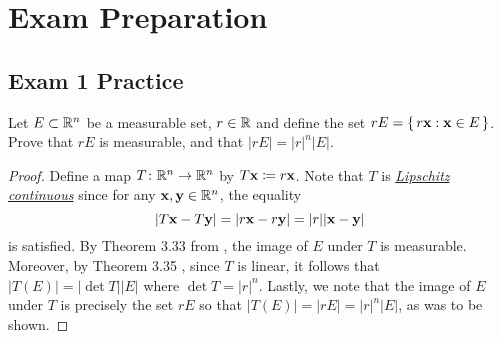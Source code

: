 \section{Exam Preparation}
\subsection{Exam 1 Practice}
\begin{problem}
Let $E\subset\mathbb{R}^n$ be a measurable set, $r\in\mathbb{R}$ and define the set
$rE=\left\{\,r\mathbf{x}:\mathbf{x}\in E\,\right\}$. Prove that $rE$ is
measurable, and that $|rE|=|r|^n|E|$.
\end{problem}
\begin{proof}
Define a map $T\colon\mathbb{R}^n\to\mathbb{R}^n$ by $T\mathbf{x}\coloneqq r\mathbf{x}$. Note
that $T$ is
\href{https://en.wikipedia.org/wiki/Lipschitz_continuity}{\emph{Lipschitz
    continuous}} since for any $\mathbf{x},\mathbf{y}\in\mathbb{R}^n$, the equality
\begin{equation}
\label{eq:prep:1:1}
|T\mathbf{x}-T\mathbf{y}|=|r\mathbf{x}-r\mathbf{y}|=|r||\mathbf{x}-\mathbf{y}|
\end{equation}
is satisfied. By Theorem 3.33 from \cite[Ch.\@ 3, p.\@55]{wheeden-zygmund},
the image of $E$ under $T$ is measurable. Moreover, by Theorem 3.35
\cite[Ch.\@ 3, p.\@ 56]{wheeden-zygmund}, since $T$ is linear, it follows
that $|T(E)|=|{\det T}||E|$ where $\det T=|r|^n$. Lastly, we note that the
image of $E$ under $T$ is precisely the set $rE$ so that
$|T(E)|=|rE|=|r|^n|E|$, as was to be shown.
\end{proof}

